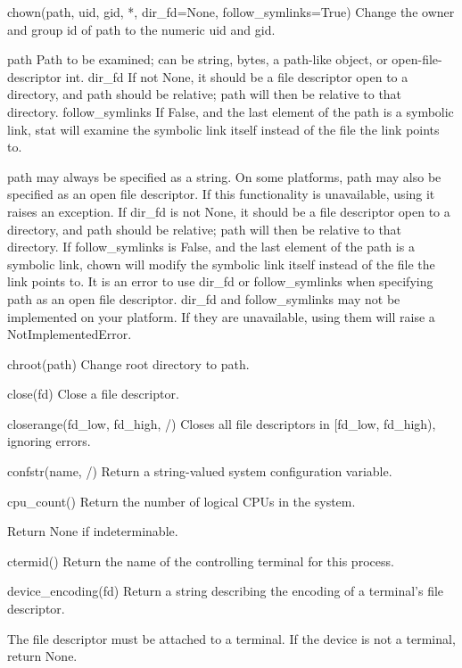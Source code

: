 \documentclass{article}
\begin{document}
    chown(path, uid, gid, *, dir_fd=None, follow_symlinks=True)
        Change the owner and group id of path to the numeric uid and gid.\

          path
            Path to be examined; can be string, bytes, a path-like object, or open-file-descriptor int.
          dir_fd
            If not None, it should be a file descriptor open to a directory,
            and path should be relative; path will then be relative to that
            directory.
          follow_symlinks
            If False, and the last element of the path is a symbolic link,
            stat will examine the symbolic link itself instead of the file
            the link points to.

        path may always be specified as a string.
        On some platforms, path may also be specified as an open file descriptor.
          If this functionality is unavailable, using it raises an exception.
        If dir_fd is not None, it should be a file descriptor open to a directory,
          and path should be relative; path will then be relative to that directory.
        If follow_symlinks is False, and the last element of the path is a symbolic
          link, chown will modify the symbolic link itself instead of the file the
          link points to.
        It is an error to use dir_fd or follow_symlinks when specifying path as
          an open file descriptor.
        dir_fd and follow_symlinks may not be implemented on your platform.
          If they are unavailable, using them will raise a NotImplementedError.

    chroot(path)
        Change root directory to path.

    close(fd)
        Close a file descriptor.

    closerange(fd_low, fd_high, /)
        Closes all file descriptors in [fd_low, fd_high), ignoring errors.

    confstr(name, /)
        Return a string-valued system configuration variable.

    cpu_count()
        Return the number of logical CPUs in the system.

        Return None if indeterminable.

    ctermid()
        Return the name of the controlling terminal for this process.

    device_encoding(fd)
        Return a string describing the encoding of a terminal's file descriptor.

        The file descriptor must be attached to a terminal.
        If the device is not a terminal, return None.
\end{document}
